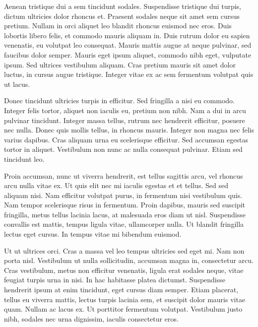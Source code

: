 Aenean tristique dui a sem tincidunt sodales. Suspendisse tristique dui turpis, dictum ultricies dolor rhoncus et. Praesent sodales neque sit amet sem cursus pretium. Nullam in orci aliquet leo blandit rhoncus euismod nec eros. Duis lobortis libero felis, et commodo mauris aliquam in. Duis rutrum dolor eu sapien venenatis, eu volutpat leo consequat. Mauris mattis augue at neque pulvinar, sed faucibus dolor semper. Mauris eget ipsum aliquet, commodo nibh eget, vulputate ipsum. Sed ultrices vestibulum aliquam. Cras pretium mauris sit amet dolor luctus, in cursus augue tristique. Integer vitae ex ac sem fermentum volutpat quis ut lacus.

Donec tincidunt ultricies turpis in efficitur. Sed fringilla a nisi eu commodo. Integer felis tortor, aliquet non iaculis eu, pretium non nibh. Nam a dui in arcu pulvinar tincidunt. Integer massa tellus, rutrum nec hendrerit efficitur, posuere nec nulla. Donec quis mollis tellus, in rhoncus mauris. Integer non magna nec felis varius dapibus. Cras aliquam urna eu scelerisque efficitur. Sed accumsan egestas tortor in aliquet. Vestibulum non nunc ac nulla consequat pulvinar. Etiam sed tincidunt leo.

Proin accumsan, nunc ut viverra hendrerit, est tellus sagittis arcu, vel rhoncus arcu nulla vitae ex. Ut quis elit nec mi iaculis egestas et et tellus. Sed sed aliquam nisi. Nam efficitur volutpat purus, in fermentum nisi vestibulum quis. Nam tempor scelerisque risus in fermentum. Proin dapibus, mauris sed suscipit fringilla, metus tellus lacinia lacus, at malesuada eros diam ut nisl. Suspendisse convallis est mattis, tempus ligula vitae, ullamcorper nulla. Ut blandit fringilla lectus eget cursus. In tempus vitae mi bibendum euismod.

Ut ut ultrices orci. Cras a massa vel leo tempus ultricies sed eget mi. Nam non porta nisl. Vestibulum ut nulla sollicitudin, accumsan magna in, consectetur arcu. Cras vestibulum, metus non efficitur venenatis, ligula erat sodales neque, vitae feugiat turpis urna in nisi. In hac habitasse platea dictumst. Suspendisse hendrerit ipsum at enim tincidunt, eget cursus diam semper. Etiam placerat, tellus eu viverra mattis, lectus turpis lacinia sem, et suscipit dolor mauris vitae quam. Nullam ac lacus ex. Ut porttitor fermentum volutpat. Vestibulum justo nibh, sodales nec urna dignissim, iaculis consectetur eros.

